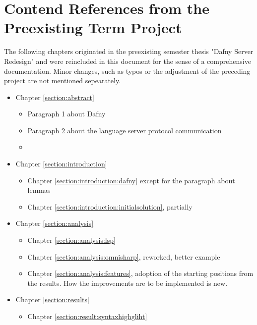 \section*{Contend References from the Preexisting Term Project}
The following chapters originated in the preexisting semester thesis "Dafny Server Redesign"\cite{sa} and were reincluded in this document for the sense of a comprehensive documentation. Minor changes, such as typos or the adjustment of the preceding project are not mentioned sepearately.
\begin{itemize}
    \item Chapter \ref{section:abstract} 
        \begin{itemize}
            \item Paragraph 1 about Dafny
            \item Paragraph 2 about the language server protocol communication
            \item  {}
        \end{itemize}
    \item Chapter \ref{section:introduction} 
        \begin{itemize}
            \item Chapter \ref{section:introduction:dafny} except for the paragraph about lemmas
            \item Chapter \ref{section:introduction:initialsolution}, partially
        \end{itemize}

    \item Chapter \ref{section:analysis} 
        \begin{itemize}
            \item Chapter \ref{section:analysis:lsp}
            \item Chapter \ref{section:analysis:omnisharp}, reworked, better example
            \item Chapter \ref{section:analysis:features}, adoption of the starting positions from the results. How the improvements are to be implemented is new.
        \end{itemize}

    \item Chapter \ref{section:results} 
        \begin{itemize}
            \item Chapter \ref{section:result:syntaxhighgliht}
        \end{itemize}


\end{itemize}
